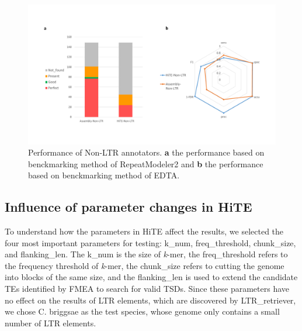 \documentclass{bmcart}
\begin{document}
\begin{figure}[h!]
	\centerline{\includegraphics[width=1.0\textwidth]{figures/NonLTRResults.pdf}}
	\caption{Performance of Non-LTR annotators. \textbf{a} the performance based on benckmarking method of RepeatModeler2 and \textbf{b} the performance based on benckmarking method of EDTA.}
	\label{fig:non_ltr_results}
\end{figure}


\subsection*{Influence of parameter changes in HiTE}
To understand how the parameters in HiTE affect the results, we selected the four most important parameters for testing: k\_num, freq\_threshold, chunk\_size, and flanking\_len. The k\_num is the size of \emph{k}-mer, the freq\_threshold refers to the frequency threshold of \emph{k}-mer, the chunk\_size refers to cutting the genome into blocks of the same size, and the flanking\_len is used to extend the candidate TEs identified by FMEA to search for valid TSDs. Since these parameters have no effect on the results of LTR elements, which are discovered by LTR\_retriever, we chose C. briggsae as the test species, whose genome only contains a small number of LTR elements.
\end{document}
